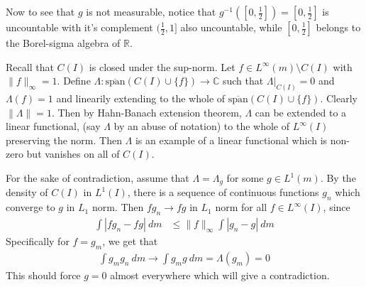 \documentclass[12pt]{exam}
\theoremstyle{plain} %
\theoremstyle{definition} %
\theoremstyle{remark} %
\begin{document}
\begin{questions}
  Now to see that $g$ is not measurable, notice that $g^{-1}([0,
  \frac{1}{2}]) = [0, \frac{1}{2}]$ is uncountable with it's
  complement $(\frac{1}{2}, 1]$ also uncountable, while $[0,
  \frac{1}{2}]$ belongs to the Borel-sigma algebra of $\mathbb{R}$.

  \question
  \begin{solution}
    Recall that $C(I)$ is closed under the sup-norm. Let $f \in
    L^{\infty}(m)\setminus C(I)$ with $\|f\|_\infty = 1$. Define $\Lambda:
    \overline{\textrm{span}}(C(I) \cup \{ f \}) \to \mathbb{C}$ such
    that $\Lambda|_{C(I)} = 0$ and $\Lambda(f) = 1$ and linearily
    extending to the whole of $\overline{\textrm{span}}(C(I) \cup \{
    f \})$. Clearly $\|\Lambda\|  = 1$. Then by Hahn-Banach extension
    theorem, $\Lambda$ can be extended to a linear functional, (say
    $\Lambda$ by an abuse of notation) to the
    whole of $L^{\infty}(I)$ preserving the norm. Then $\Lambda$ is
    an example of a linear functional which is non-zero but vanishes
    on all of $C(I)$.

    For the sake of contradiction, assume that $\Lambda =  \Lambda_g$
    for some $g \in L^{1}(m)$. By the density of $C(I)$ in
    $L^{1}(I)$, there is a sequence of continuous functions $g_n$
    which converge to $ g$ in $L_1$ norm. Then $fg_n \to fg$ in $L_1$
    norm for all
    $f \in L^{\infty}( I)$, since
    \begin{align*}
      \int |fg_n - fg| \ d m & \le \|f\|_\infty \int |g_n - g| \ d m
    \end{align*}
    Specifically for $f = g_m$, we get that
    \begin{align*}
      \int g_m g_n \ d m \to \int g_m g \ d m = \Lambda(g_m) = 0
    \end{align*}
    This should force $g = 0$ almost everywhere which will give a contradiction.
  \end{solution}

\end{questions}
\printbibliography[heading=bibintoc]
\end{document}
